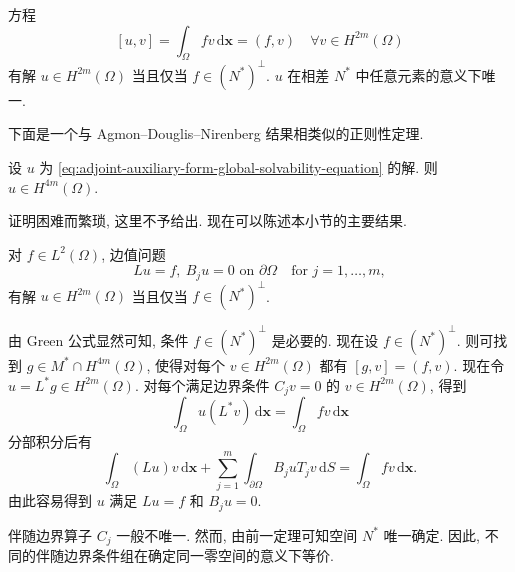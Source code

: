 \begin{Lemma}
\label{lem:adjoint-auxiliary-form-global-solvability}
方程
\begin{equation}\label{eq:adjoint-auxiliary-form-global-solvability-equation}
[u,v]=\int_\Omega fv\,\mathrm{d}\bm{x}=(f,v)\quad\forall v\in H^{2m}(\Omega)
\end{equation}
有解 $u\in H^{2m}(\Omega)$ 当且仅当 $f\in(N^*)^\perp$. $u$ 在相差 $N^*$ 中任意元素的意义下唯一.
\end{Lemma}

下面是一个与 Agmon--Douglis--Nirenberg 结果相类似的正则性定理.

\begin{Theorem}
\label{thm:adjoint-auxiliary-solution-higher-regularity}
设 $u$ 为 \eqref{eq:adjoint-auxiliary-form-global-solvability-equation} 的解. 则 $u\in H^{4m}(\Omega)$.
\end{Theorem}

证明困难而繁琐, 这里不予给出. 现在可以陈述本小节的主要结果.

\begin{Theorem}
\label{thm:elliptic-adjoint-orthogonality-solvability}
对 $f\in L^2(\Omega)$, 边值问题
\begin{equation}\label{eq:elliptic-homogeneous-boundary-fredholm-solvability}
Lu=f,\ B_ju=0\text{ on }\partial\Omega\quad\text{for }j=1,\ldots,m,
\end{equation}
有解 $u\in H^{2m}(\Omega)$ 当且仅当 $f\in(N^*)^\perp$.
\end{Theorem}

\begin{Proof}
由 Green 公式显然可知, 条件 $f\in(N^*)^\perp$ 是必要的. 现在设 $f\in(N^*)^\perp$. 则可找到 $g\in M^*\cap H^{4m}(\Omega)$, 使得对每个 $v\in H^{2m}(\Omega)$ 都有 $[g,v]=(f,v)$. 现在令 $u=L^*g\in H^{2m}(\Omega)$. 对每个满足边界条件 $C_jv=0$ 的 $v\in H^{2m}(\Omega)$, 得到
\begin{equation}\label{eq:adjoint-solvability-proof-weak-interior-identity}
\int_\Omega u(L^*v)\,\mathrm{d}\bm{x}=\int_\Omega fv\,\mathrm{d}\bm{x}
\end{equation}
分部积分后有
\begin{equation}\label{eq:adjoint-solvability-proof-recovered-boundary-identity}
\int_\Omega(Lu)v\,\mathrm{d}\bm{x}+\sum_{j=1}^m\int_{\partial\Omega}B_juT_jv\,\mathrm{d}S=\int_\Omega fv\,\mathrm{d}\bm{x}.
\end{equation}
由此容易得到 $u$ 满足 $Lu=f$ 和 $B_ju=0$.
\end{Proof}

\begin{Remark}
\label{rem:adjoint-boundary-nullspace-uniqueness}
伴随边界算子 $C_j$ 一般不唯一. 然而, 由前一定理可知空间 $N^*$ 唯一确定. 因此, 不同的伴随边界条件组在确定同一零空间的意义下等价.
\end{Remark}

